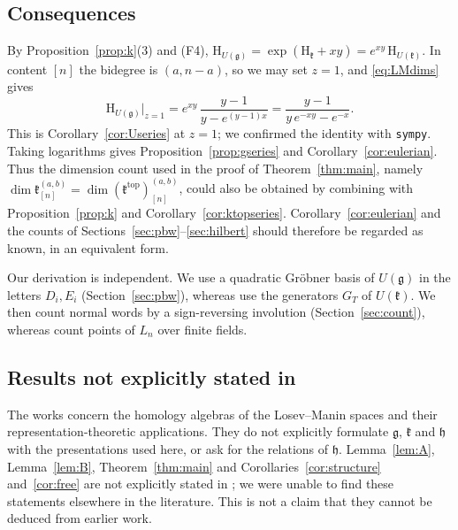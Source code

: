 \documentclass[11pt]{amsart}
\theoremstyle{definition}
\theoremstyle{remark}
\newcommand{\g}{\mathfrak{g}}
\newcommand{\h}{\mathfrak{h}}
\newcommand{\kr}{\mathfrak{k}}
\newcommand{\ktop}{\mathfrak{k}^{\mathrm{top}}}
\newcommand{\Hs}{\mathrm{H}}
\begin{document}
\subsection*{Consequences}
By Proposition~\ref{prop:k}(3) and (F4), $\Hs_{U(\g)}=\exp(\Hs_\kr+xy)=e^{xy}\,\Hs_{U(\kr)}$. In content $[n]$ the bidegree is $(a,n-a)$, so we may set $z=1$, and \eqref{eq:LMdims} gives
\[
\Hs_{U(\g)}\big|_{z=1}=e^{xy}\,\frac{y-1}{y-e^{(y-1)x}}=\frac{y-1}{y\,e^{-xy}-e^{-x}}.
\]
This is Corollary~\ref{cor:Useries} at $z=1$; we confirmed the identity with \texttt{sympy}. Taking logarithms gives Proposition~\ref{prop:gseries} and Corollary~\ref{cor:eulerian}. Thus the dimension count used in the proof of Theorem~\ref{thm:main}, namely $\dim\kr_{[n]}^{(a,b)}=\dim(\ktop)_{[n]}^{(a,b)}$, could also be obtained by combining \cite{LM,DST} with Proposition~\ref{prop:k} and Corollary~\ref{cor:ktopseries}. Corollary~\ref{cor:eulerian} and the counts of Sections~\ref{sec:pbw}--\ref{sec:hilbert} should therefore be regarded as known, in an equivalent form.

Our derivation is independent. We use a quadratic Gr\"obner basis of $U(\g)$ in the letters $D_i,E_i$ (Section~\ref{sec:pbw}), whereas \cite{DST} use the generators $G_T$ of $U(\kr)$. We then count normal words by a sign-reversing involution (Section~\ref{sec:count}), whereas \cite{LM} count points of $L_n$ over finite fields.

\subsection*{Results not explicitly stated in \texorpdfstring{\cite{LM,DST}}{[LM, DST]}}
The works \cite{LM,DST} concern the homology algebras of the Losev--Manin spaces and their representation-theoretic applications. They do not explicitly formulate $\g$, $\kr$ and $\h$ with the presentations used here, or ask for the relations of $\h$. Lemma~\ref{lem:A}, Lemma~\ref{lem:B}, Theorem~\ref{thm:main} and Corollaries~\ref{cor:structure} and~\ref{cor:free} are not explicitly stated in \cite{LM,DST}; we were unable to find these statements elsewhere in the literature. This is not a claim that they cannot be deduced from earlier work.
\end{document}
